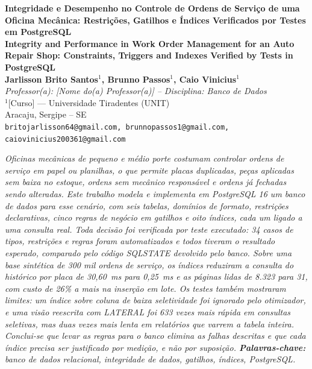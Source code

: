 \documentclass[a4paper,12pt]{article}
\newenvironment{resumo}{%
  \list{}{\advance\topsep by6pt\relax
    \leftmargin=0.8cm
    \labelwidth=0pt
    \listparindent=0pt
    \itemindent\listparindent
    \rightmargin\leftmargin}\item[\hskip\labelsep\bfseries\itshape Resumo.]\itshape}%
  {\endlist}
\begin{document}
\pagestyle{empty}
\sloppy

\begin{center}
  {\fontsize{16}{20}\selectfont\bfseries Integridade e Desempenho no Controle de Ordens de Serviço de uma Oficina Mecânica: Restrições, Gatilhos e Índices Verificados por Testes em PostgreSQL}\\[4pt]
  {\fontsize{14}{18}\selectfont\bfseries Integrity and Performance in Work Order Management for an Auto Repair Shop: Constraints, Triggers and Indexes Verified by Tests in PostgreSQL}\\[12pt]

  {\normalsize\bfseries Jarlisson Brito Santos$^{1}$, Brunno Passos$^{1}$, Caio Vinicius$^{1}$}\\[4pt]
  {\footnotesize\itshape Professor(a): [Nome do(a) Professor(a)] -- Disciplina: Banco de Dados}\\[6pt]

  {\normalsize
    $^{1}$[Curso] — Universidade Tiradentes (UNIT)\\{}
    Aracaju, Sergipe -- SE\\{}
    \footnotesize\texttt{britojarlisson64@gmail.com, brunnopassos1@gmail.com, caiovinicius200361@gmail.com}
  }
\end{center}
\vspace{12pt}

\begin{resumo}
Oficinas mecânicas de pequeno e médio porte costumam controlar ordens de
serviço em papel ou planilhas, o que permite placas duplicadas, peças
aplicadas sem baixa no estoque, ordens sem mecânico responsável e ordens
já fechadas sendo alteradas. Este trabalho modela e implementa em
PostgreSQL 16 um banco de dados para esse cenário, com seis tabelas,
domínios de formato, restrições declarativas, cinco regras de negócio
em gatilhos e oito índices, cada um ligado a uma consulta real. Toda
decisão foi verificada por teste executado: 34 casos de tipos,
restrições e regras foram automatizados e todos tiveram o resultado
esperado, comparado pelo código SQLSTATE devolvido pelo banco. Sobre uma
base sintética de 300 mil ordens de serviço, os índices reduziram a
consulta do histórico por placa de 30,60~ms para 0,25~ms e as páginas
lidas de 8.323 para 31, com custo de 26\% a mais na inserção em lote. Os
testes também mostraram limites: um índice sobre coluna de baixa
seletividade foi ignorado pelo otimizador, e uma visão reescrita com
\emph{LATERAL} foi 633 vezes mais rápida em consultas seletivas, mas
duas vezes mais lenta em relatórios que varrem a tabela inteira. Conclui-se
que levar as regras para o banco elimina as falhas descritas e que cada
índice precisa ser justificado por medição, e não por suposição.
\end{resumo}
\noindent\textbf{Palavras-chave:} banco de dados relacional, integridade de dados, gatilhos, índices, PostgreSQL.
\end{document}
